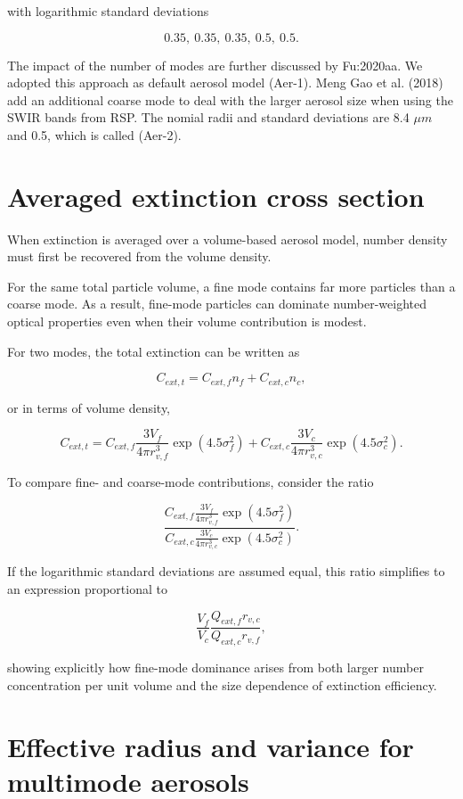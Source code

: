 \documentclass[
  letterpaper,
]{scrbook}
\begin{document}
with logarithmic standard deviations

\[
0.35,\ 0.35,\ 0.35,\ 0.5,\ 0.5.
\]

The impact of the number of modes are further discussed by Fu:2020aa. We
adopted this approach as default aerosol model (Aer-1). Meng Gao et al.
(2018) add an additional coarse mode to deal with the larger aerosol
size when using the SWIR bands from RSP. The nomial radii and standard
deviations are 8.4 \(\mu m\) and 0.5, which is called (Aer-2).

\section{Averaged extinction cross
section}\label{averaged-extinction-cross-section}

When extinction is averaged over a volume-based aerosol model, number
density must first be recovered from the volume density.

For the same total particle volume, a fine mode contains far more
particles than a coarse mode. As a result, fine-mode particles can
dominate number-weighted optical properties even when their volume
contribution is modest.

For two modes, the total extinction can be written as

\[
C_{ext,t}=C_{ext,f} n_f+C_{ext,c} n_c,
\]

or in terms of volume density,

\[
C_{ext,t}= C_{ext,f} \frac{3 V_f}{4\pi r^3_{v,f}}\exp(4.5 \sigma^2_f)+
C_{ext,c} \frac{3 V_c}{4\pi r^3_{v,c}}\exp(4.5 \sigma^2_c).
\]

To compare fine- and coarse-mode contributions, consider the ratio

\[
\frac{C_{ext,f} \frac{3 V_f}{4\pi r^3_{v,f}}\exp(4.5 \sigma^2_f)}
{C_{ext,c} \frac{3 V_c}{4\pi r^3_{v,c}}\exp(4.5 \sigma^2_c)}.
\]

If the logarithmic standard deviations are assumed equal, this ratio
simplifies to an expression proportional to

\[
\frac{V_f}{V_c}\frac{Q_{ext,f} r_{v,c}}{Q_{ext,c} r_{v,f}},
\]

showing explicitly how fine-mode dominance arises from both larger
number concentration per unit volume and the size dependence of
extinction efficiency.

\section{Effective radius and variance for multimode
aerosols}\label{effective-radius-and-variance-for-multimode-aerosols}
\end{document}
